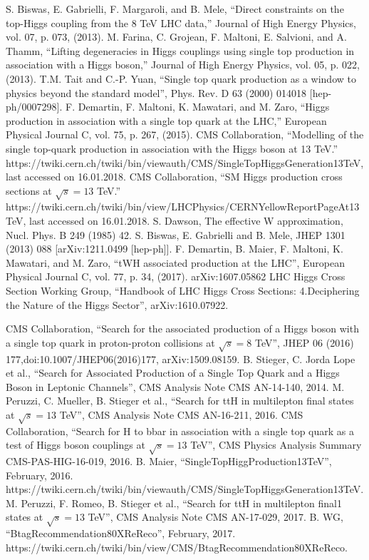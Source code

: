 \documentclass[print]{nuthesis}
\begin{document}
\begin{thebibliography}{200}
 S. Biswas, E. Gabrielli, F. Margaroli, and B. Mele, ``Direct constraints on the top-Higgs coupling from the 8 TeV LHC data,'' Journal of High Energy Physics, vol. 07, p. 073, (2013).
M. Farina, C. Grojean, F. Maltoni, E. Salvioni, and A. Thamm, ``Lifting degeneracies in Higgs couplings using single top production in association with a Higgs boson,'' Journal of High Energy Physics, vol. 05, p. 022, (2013).
T.M. Tait and C.-P. Yuan, ``Single top quark production as a window to physics beyond the standard model'', Phys. Rev. D 63 (2000) 014018 [hep-ph/0007298].
F. Demartin, F. Maltoni, K. Mawatari, and M. Zaro, ``Higgs production in association with a single top quark at the LHC,'' European Physical Journal C, vol. 75, p. 267, (2015).
CMS Collaboration, ``Modelling of the single top-quark production in association with the Higgs boson at 13 TeV.'' https://twiki.cern.ch/twiki/bin/viewauth/CMS/SingleTopHiggsGeneration13TeV, last accessed on 16.01.2018.
 CMS Collaboration, ``SM Higgs production cross sections at $\sqrt{s} = 13$ TeV.'' https://twiki.cern.ch/twiki/bin/view/LHCPhysics/CERNYellowReportPageAt13TeV, last accessed on 16.01.2018.
 S. Dawson, The effective W approximation, Nucl. Phys. B 249 (1985) 42.
 S. Biswas, E. Gabrielli and B. Mele, JHEP 1301 (2013) 088 [arXiv:1211.0499 [hep-ph]].
 F. Demartin, B. Maier, F. Maltoni, K. Mawatari, and M. Zaro, ``tWH associated production at the LHC'', European Physical Journal C, vol. 77, p. 34, (2017). arXiv:1607.05862
 LHC Higgs Cross Section Working Group, ``Handbook of LHC Higgs Cross Sections: 4.Deciphering the Nature of the Higgs Sector'', arXiv:1610.07922.



  
  
CMS Collaboration, ``Search for the associated production of a Higgs boson with a single top quark in proton-proton collisions at  $\sqrt{s}=8 $ TeV'', JHEP 06 (2016) 177,doi:10.1007/JHEP06(2016)177, arXiv:1509.08159.
B. Stieger, C. Jorda Lope et al., ``Search for Associated Production of a Single Top Quark and a Higgs Boson in Leptonic Channels'', CMS Analysis Note CMS AN-14-140, 2014.
M. Peruzzi, C. Mueller, B. Stieger et al., ``Search for ttH in multilepton final states at $\sqrt{s}=13$ TeV'', CMS Analysis Note CMS AN-16-211, 2016.
CMS Collaboration, ``Search for H to bbar in association with a single top quark as a test of Higgs boson couplings at $\sqrt{s}=13$ TeV'', CMS Physics Analysis Summary CMS-PAS-HIG-16-019, 2016.
B. Maier, ``SingleTopHiggProduction13TeV'', February, 2016. https://twiki.cern.ch/twiki/bin/viewauth/CMS/SingleTopHiggsGeneration13TeV.
M. Peruzzi, F. Romeo, B. Stieger et al., ``Search for ttH in multilepton final1 states at $\sqrt{s}=13$ TeV'', CMS Analysis Note CMS AN-17-029, 2017.
B. WG, ``BtagRecommendation80XReReco'', February, 2017. https://twiki.cern.ch/twiki/bin/view/CMS/BtagRecommendation80XReReco.
  

\end{thebibliography}
\end{document}
